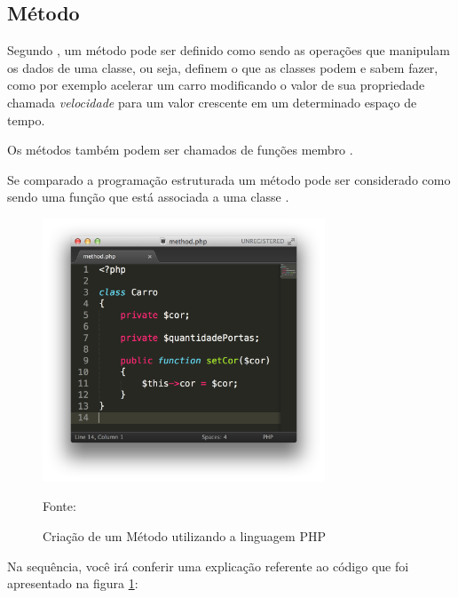 \subsection{Método}

Segundo , um
método pode ser definido como sendo as operações que manipulam os dados de uma
classe, ou seja, definem o que as classes podem e sabem fazer, como por exemplo
acelerar um carro modificando o valor de sua propriedade chamada
\textit{velocidade} para um valor crescente em um determinado espaço de tempo.

Os métodos também podem ser chamados de funções membro \cite{c++ComoProgramar}.

Se comparado a programação estruturada um método pode ser considerado como sendo
uma função que está associada a uma classe \cite{programmingPhp}.

\begin{figure}[h!tb]
	\caption{Criação de um Método utilizando a linguagem PHP}
	\label{fig:metodo}

	\centering
	\includegraphics[width=0.75\textwidth]{images/method.png}

	\centering
	\footnotesize Fonte: \fonteOAutor
\end{figure}

\FloatBarrier 	%

Na sequência, você irá conferir uma explicação referente ao código que foi
apresentado na figura \ref{fig:metodo}:

